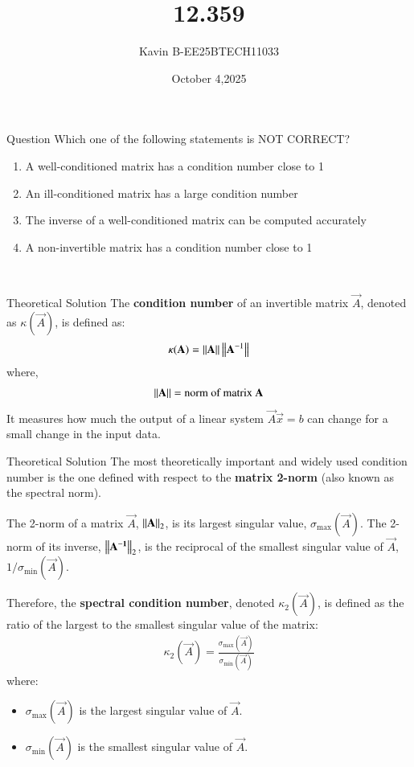 \documentclass{beamer}
\begin{document}
\title 
{12.359}
\date{October 4,2025}


\author 
{Kavin B-EE25BTECH11033}






\frame{\titlepage}
\begin{frame}{Question}
Which one of the following statements is NOT CORRECT?

\begin{enumerate}
\item A well-conditioned matrix has a condition number close to 1  
\item An ill-conditioned matrix has a large condition number  
\item The inverse of a well-conditioned matrix can be computed accurately  
\item A non-invertible matrix has a condition number close to 1  
\end{enumerate}\\    
\bigskip
\end{frame}



\begin{frame}{Theoretical Solution}
The \textbf{condition number} of an invertible matrix $\vec{A}$, denoted as $\kappa(\vec{A})$, is defined as:
\begin{align}
    \kappa(\mathbf{A}) = \left\lVert\mathbf{A}\right\rVert \left\lVert\mathbf{A}^{-1}\right\rVert
\end{align}
where,
\begin{align*}
    \left\lVert\mathbf{A}\right\rVert = \text{norm of matrix $\mathbf{A}$}
\end{align*}
It measures how much the output of a linear system $\vec{A}\vec{x}=b$ can change for a small change in the input data.\\
\bigskip
\end{frame}

\begin{frame}{Theoretical Solution}
The most theoretically important and widely used condition number is the one defined with respect to the \textbf{matrix 2-norm} (also known as the spectral norm).

The 2-norm of a matrix $\vec{A}$, $\left\lVert\mathbf{A}\right\rVert_2$, is its largest singular value, $\sigma_{\text{max}}(\vec{A})$. The 2-norm of its inverse, $\left\lVert\mathbf{A^{-1}}\right\rVert_2$, is the reciprocal of the smallest singular value of $\vec{A}$, $1/\sigma_{\text{min}}(\vec{A})$.

Therefore, the \textbf{spectral condition number}, denoted $\kappa_2(\vec{A})$, is defined as the ratio of the largest to the smallest singular value of the matrix:
\begin{align}
\kappa_2(\vec{A}) = \frac{\sigma_{\text{max}}(\vec{A})}{\sigma_{\text{min}}(\vec{A})}
\end{align}
where:
\begin{itemize}
    \item $\sigma_{\text{max}}(\vec{A})$ is the largest singular value of $\vec{A}$.
    \item $\sigma_{\text{min}}(\vec{A})$ is the smallest singular value of $\vec{A}$.
\end{itemize}
\end{frame}
\end{document}
